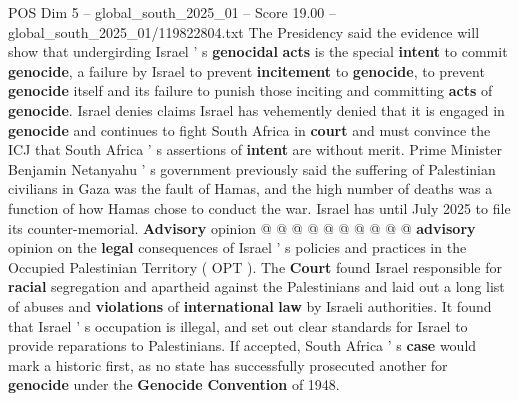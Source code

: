 \begin{textsample}{POS Dim 5 – global\_south\_2025\_01 – Score 19.00 – global\_south\_2025\_01/119822804.txt}
The Presidency said the evidence will show that undergirding Israel ' s \textbf{genocidal} \textbf{acts} is the special \textbf{intent} to commit \textbf{genocide}, a failure by Israel to prevent \textbf{incitement} to \textbf{genocide}, to prevent \textbf{genocide} itself and its failure to punish those inciting and committing \textbf{acts} of \textbf{genocide}.
Israel denies claims Israel has vehemently denied that it is engaged in \textbf{genocide} and continues to fight South Africa in \textbf{court} and must convince the ICJ that South Africa ' s assertions of \textbf{intent} are without merit.
Prime Minister Benjamin Netanyahu ' s government previously said the suffering of Palestinian civilians in Gaza was the fault of Hamas, and the high number of deaths was a function of how Hamas chose to conduct the war.
Israel has until July 2025 to file its counter-memorial. \textbf{Advisory} opinion @ @ @ @ @ @ @ @ @ @ \textbf{advisory} opinion on the \textbf{legal} consequences of Israel ' s policies and practices in the Occupied Palestinian Territory ( OPT ).
The \textbf{Court} found Israel responsible for \textbf{racial} segregation and apartheid against the Palestinians and laid out a long list of abuses and \textbf{violations} of \textbf{international} \textbf{law} by Israeli authorities.
It found that Israel ' s occupation is illegal, and set out clear standards for Israel to provide reparations to Palestinians.
If accepted, South Africa ' s \textbf{case} would mark a historic first, as no state has successfully prosecuted another for \textbf{genocide} under the \textbf{Genocide} \textbf{Convention} of 1948.

\end{textsample}
